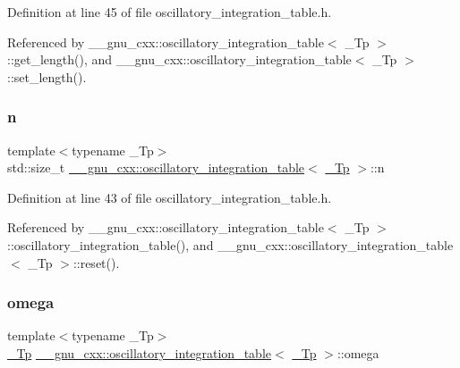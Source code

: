 Definition at line 45 of file oscillatory\+\_\+integration\+\_\+table.\+h.



Referenced by \+\_\+\+\_\+gnu\+\_\+cxx\+::oscillatory\+\_\+integration\+\_\+table$<$ \+\_\+\+Tp $>$\+::get\+\_\+length(), and \+\_\+\+\_\+gnu\+\_\+cxx\+::oscillatory\+\_\+integration\+\_\+table$<$ \+\_\+\+Tp $>$\+::set\+\_\+length().

\mbox{\label{struct____gnu__cxx_1_1oscillatory__integration__table_a7afb6e15c7cf51c48ed89fc2d8450179}} 
\subsubsection{\texorpdfstring{n}{n}}
{\footnotesize\ttfamily template$<$typename \+\_\+\+Tp$>$ \\
std\+::size\+\_\+t \hyperlink{struct____gnu__cxx_1_1oscillatory__integration__table}{\+\_\+\+\_\+gnu\+\_\+cxx\+::oscillatory\+\_\+integration\+\_\+table}$<$ \hyperlink{namespace____gnu__cxx_a3b19a9c800ca194374ef9172290f7d79}{\+\_\+\+Tp} $>$\+::n}



Definition at line 43 of file oscillatory\+\_\+integration\+\_\+table.\+h.



Referenced by \+\_\+\+\_\+gnu\+\_\+cxx\+::oscillatory\+\_\+integration\+\_\+table$<$ \+\_\+\+Tp $>$\+::oscillatory\+\_\+integration\+\_\+table(), and \+\_\+\+\_\+gnu\+\_\+cxx\+::oscillatory\+\_\+integration\+\_\+table$<$ \+\_\+\+Tp $>$\+::reset().

\mbox{\label{struct____gnu__cxx_1_1oscillatory__integration__table_a722a28c43e85cce33bbe6337e6a5c9eb}} 
\subsubsection{\texorpdfstring{omega}{omega}}
{\footnotesize\ttfamily template$<$typename \+\_\+\+Tp$>$ \\
\hyperlink{namespace____gnu__cxx_a3b19a9c800ca194374ef9172290f7d79}{\+\_\+\+Tp} \hyperlink{struct____gnu__cxx_1_1oscillatory__integration__table}{\+\_\+\+\_\+gnu\+\_\+cxx\+::oscillatory\+\_\+integration\+\_\+table}$<$ \hyperlink{namespace____gnu__cxx_a3b19a9c800ca194374ef9172290f7d79}{\+\_\+\+Tp} $>$\+::omega}



